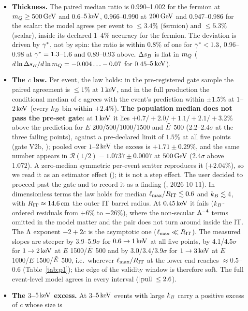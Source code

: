 \begin{itemize}
\item \textbf{Thickness.} The paired median ratio is 0.990--1.002 for the fermion at $m_Q\ge500\,\mathrm{GeV}$ and
  $0.6$--$5\,\mathrm{keV}$, 0.966--0.990 at $200\,\mathrm{GeV}$ and 0.947--0.986 for the scalar: the model agrees per event to $\le3.4\%$
  (fermion) and $\le5.3\%$ (scalar), inside its declared 1--4\% accuracy for the fermion. The deviation is driven by
  $\gamma^*$, not by spin: the ratio is within 0.8\% of one for $\gamma^*<1.3$, 0.96--0.98 at $\gamma^*=1.3$--1.6 and 0.89--0.93
  above. $\Delta s_B$ is flat in $m_Q$ ($d\ln\Delta s_B/d\ln m_Q=-0.004\ldots-0.07$ for $0.45$--$5\,\mathrm{keV}$).
\item \textbf{The $c$ law.} Per event, the law holds: in the pre-registered gate sample the paired agreement is
  $\le1\%$ at $1\,\mathrm{keV}$, and in the full production the conditional median of $c$ agrees with the event's prediction
  within $\pm1.5\%$ at $1$--$2\,\mathrm{keV}$ (every $k_B$ bin within $\pm2.4\%$). \textbf{The population median does not pass
  the pre-set gate}: at $1\,\mathrm{keV}$ it lies $+0.7/+2.0/+1.1/+2.1/+3.2\%$ above the prediction for $E$ 200/500/1000/1500 and
  $\tilde{E}$ 500 (2.2--2.4$\sigma$ at the three failing points), against a pre-declared limit of $1.5\%$ at all five points
  (gate V2b, ); pooled over $1$--$2\,\mathrm{keV}$ the excess is $+1.71\pm0.29\%$, and the same
  number appears in $\mathcal R(1/2)=1.0737\pm0.0007$ at $500\,\mathrm{GeV}$ (2.4$\sigma$ above 1.072). A zero-median symmetric
  per-event scatter reproduces it ($+2.04\%$), so we read it as an estimator effect (\EST{}); it is not a step effect.
  The user decided to proceed past the gate and to record it as a finding (, 2026-10-11). In dimensionless terms the law holds for median
  $\ell_{\max}/R_{\rm IT}\lesssim0.6$ and $k_B\lesssim4$, with $R_{\rm IT}\approx14.6\,\mathrm{cm}$ the outer IT barrel radius. At $0.45\,\mathrm{keV}$ it fails
  ($k_B$-ordered residuals from $+6\%$ to $-26\%$), where the non-secular $\Lambda^{-4}$ terms omitted in the model matter
  and the pair does not turn around inside the IT. The $\Lambda$ exponent $-2+2c$ is the asymptotic one ($\ell_{\max}\ll R_{\rm IT}$). The measured slopes are steeper by
  3.9--5.9$\sigma$ for $0.6\to1\,\mathrm{keV}$ at all five points, by 4.1/4.5$\sigma$ for $1\to2\,\mathrm{keV}$ at $E$ 1500/$\tilde{E}$ 500 and by
  3.0/3.4/3.9$\sigma$ for $1\to3\,\mathrm{keV}$ at $E$ 1000/$E$ 1500/$\tilde{E}$ 500, i.e.\ wherever $\ell_{\max}/R_{\rm IT}$ at the lower end
  reaches $\approx0.5$--0.6 (Table~\ref{tab:p1}); the edge of the validity window is therefore soft. The full
  event-level model agrees in every interval ($|{\rm pull}|\le2.6$).
\item \textbf{The $3$--$5\,\mathrm{keV}$ excess.} At $3$--$5\,\mathrm{keV}$ events with large $k_B$ carry a positive excess of $c$ whose size is

\end{itemize}
